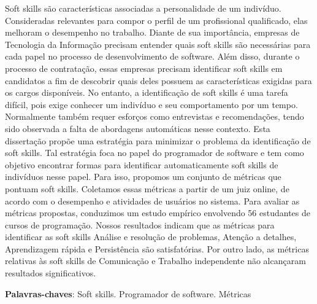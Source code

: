 \documentclass{ppgi}
\begin{document}
\begin{resumo}

Soft skills são características associadas a personalidade de um indivíduo.
Consideradas relevantes para compor o perfil de um profissional qualificado, elas melhoram o desempenho no trabalho.
Diante de sua importância, empresas de Tecnologia da Informação precisam entender quais soft skills são necessárias para cada papel no processo de desenvolvimento de software.
Além disso, durante o processo de contratação, essas empresas precisam identificar soft skills em candidatos a fim de descobrir quais deles possuem as características exigidas para os cargos disponíveis.
No entanto, a identificação de soft skills é uma tarefa difícil, pois exige conhecer um indivíduo e seu comportamento por um tempo. 
Normalmente também requer esforços como entrevistas e recomendações, tendo sido observada a falta de abordagens automáticas nesse contexto.
Esta dissertação propõe uma estratégia para minimizar o problema da identificação de soft skills.
Tal estratégia foca no papel do programador de software e tem como objetivo encontrar formas para identificar automaticamente soft skills de indivíduos nesse papel.
Para isso, propomos um conjunto de métricas que pontuam soft skills.
Coletamos essas métricas a partir de um juiz online, de acordo com o desempenho e atividades de usuários no sistema.
Para avaliar as métricas propostas, conduzimos um estudo empírico envolvendo 56 estudantes de cursos de programação.
Nossos resultados indicam que as métricas para identificar as soft skills Análise e resolução de problemas, Atenção a detalhes, Aprendizagem rápida e Persistência são satisfatórias.
Por outro lado, as métricas relativas às soft skills de Comunicação e Trabalho independente não alcançaram resultados significativos.

\posresumo

\textbf{Palavras-chaves}: Soft skills. Programador de software. Métricas
\end{resumo}
\end{document}
